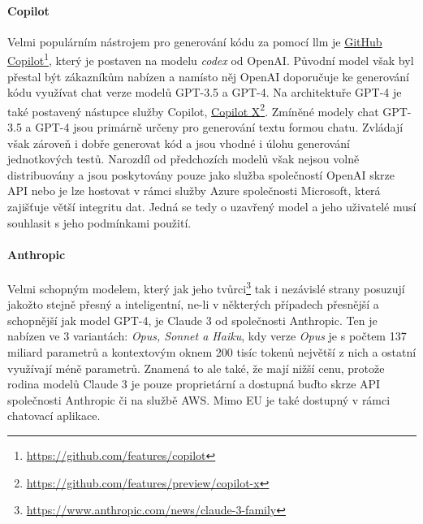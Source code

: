 \documentclass[czech, ma, kiv, he, iso690numb, pdf, viewonly]{fasthesis}
\begin{document}
    \paragraph{Copilot} Velmi populárním nástrojem pro generování kódu za pomocí \gls{llm} je \href{https://github.com/features/copilot}{GitHub Copilot}\footnote{\url{https://github.com/features/copilot}}, který je postaven na modelu \textit{codex} od OpenAI. Původní model však byl přestal být zákazníkům nabízen a namísto něj OpenAI doporučuje ke generování kódu využívat chat verze modelů GPT-3.5 a GPT-4. Na architektuře GPT-4 je také postavený nástupce služby Copilot, \href{https://github.com/features/preview/copilot-x}{Copilot X}\footnote{\url{https://github.com/features/preview/copilot-x}}. Zmíněné modely chat GPT-3.5 a GPT-4 jsou primárně určeny pro generování textu formou chatu. Zvládají však zároveň i dobře generovat kód a jsou vhodné i úlohu generování jednotkových testů. \cite{openai2024gpt4} Narozdíl od předchozích modelů však nejsou volně distribuovány a jsou poskytovány pouze jako služba společností OpenAI skrze API nebo je lze hostovat v rámci služby Azure společnosti Microsoft, která zajišťuje větší integritu dat. Jedná se tedy o uzavřený model a jeho uživatelé musí souhlasit s jeho podmínkami použití.

    \paragraph{Anthropic} Velmi schopným modelem, který jak jeho tvůrci\footnote{\url{https://www.anthropic.com/news/claude-3-family}} tak i nezávislé strany posuzují jakožto stejně přesný a inteligentní, ne-li v některých případech přesnější a schopnější jak model GPT-4, je Claude 3 od společnosti Anthropic. \cite{kevian2024capabilities} Ten je nabízen ve 3 variantách: \textit{Opus, Sonnet a Haiku}, kdy verze \textit{Opus} je s počtem 137 miliard parametrů a kontextovým oknem 200 tisíc tokenů největší z nich a ostatní využívají méně parametrů. Znamená to ale také, že mají nižší cenu, protože rodina modelů Claude 3 je pouze proprietární a dostupná buďto skrze API společnosti Anthropic či na službě AWS. Mimo EU je také dostupný v rámci chatovací aplikace. \cite{anthropic2023claude}
\end{document}
